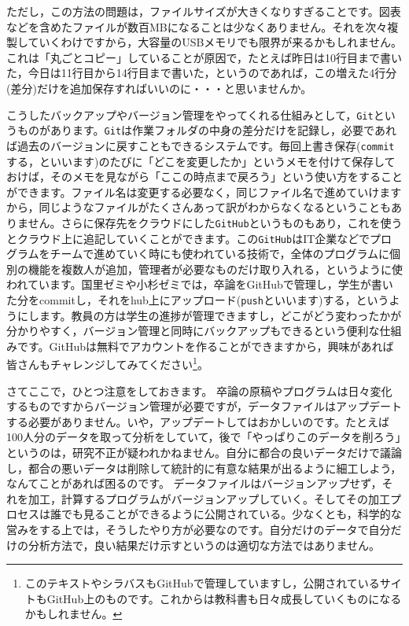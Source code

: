 \documentclass{ltjsbook}
\begin{document}
ただし，この方法の問題は，ファイルサイズが大きくなりすぎることです。図表などを含めたファイルが数百MBになることは少なくありません。それを次々複製していくわけですから，大容量のUSBメモリでも限界が来るかもしれません。
これは「丸ごとコピー」していることが原因で，たとえば昨日は10行目まで書いた，今日は11行目から14行目まで書いた，というのであれば，この増えた4行分(差分)だけを追加保存すればいいのに・・・と思いませんか。

こうしたバックアップやバージョン管理をやってくれる仕組みとして，\verb|Git|というものがあります。\verb|Git|は作業フォルダの中身の差分だけを記録し，必要であれば過去のバージョンに戻すこともできるシステムです。毎回上書き保存(\verb|commit|する，といいます)のたびに「どこを変更したか」というメモを付けて保存しておけば，そのメモを見ながら「ここの時点まで戻ろう」という使い方をすることができます。ファイル名は変更する必要なく，同じファイル名で進めていけますから，同じようなファイルがたくさんあって訳がわからなくなるということもありません。さらに保存先をクラウドにした\verb|GitHub|というものもあり，これを使うとクラウド上に追記していくことができます。この\verb|GitHub|はIT企業などでプログラムをチームで進めていく時にも使われている技術で，全体のプログラムに個別の機能を複数人が追加，管理者が必要なものだけ取り入れる，というように使われています。国里ゼミや小杉ゼミでは，卒論をGitHubで管理し，学生が書いた分をcommitし，それをhub上にアップロード(\verb|push|といいます)する，というようにします。教員の方は学生の進捗が管理できますし，どこがどう変わったかが分かりやすく，バージョン管理と同時にバックアップもできるという便利な仕組みです。GitHubは無料でアカウントを作ることができますから，興味があれば皆さんもチャレンジしてみてください\footnote{このテキストやシラバスもGitHubで管理していますし，公開されているサイトもGitHub上のものです。これからは教科書も日々成長していくものになるかもしれません。}。

さてここで，ひとつ注意をしておきます。
卒論の原稿やプログラムは日々変化するものですからバージョン管理が必要ですが，データファイルはアップデートする必要がありません。いや，アップデートしてはおかしいのです。たとえば100人分のデータを取って分析をしていて，後で「やっぱりこのデータを削ろう」というのは，研究不正が疑われかねません。自分に都合の良いデータだけで議論し，都合の悪いデータは削除して統計的に有意な結果が出るように細工しよう，なんてことがあれば困るのです。
データファイルはバージョンアップせず，それを加工，計算するプログラムがバージョンアップしていく。そしてその加工プロセスは誰でも見ることができるように公開されている。少なくとも，科学的な営みをする上では，そうしたやり方が必要なのです。自分だけのデータで自分だけの分析方法で，良い結果だけ示すというのは適切な方法ではありません。
\end{document}
